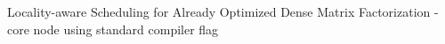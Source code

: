 \begin{frame}[label=ladmf]{Locality-aware Scheduling for Already Optimized Dense Matrix Factorization}
-core node using standard compiler flag
\end{frame}
